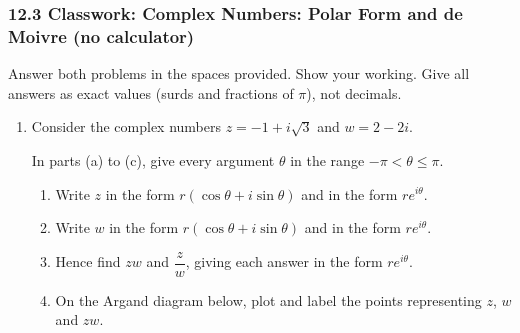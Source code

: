 \documentclass[12pt, twoside]{article}
\begin{document}
\subsubsection*{12.3 Classwork: Complex Numbers: Polar Form and de Moivre (no calculator)}

Answer both problems in the spaces provided. Show your working. Give
all answers as exact values (surds and fractions of $\pi$), not decimals.

\begin{enumerate}[itemsep=0.15cm]


\item[1.]

Consider the complex numbers $z = -1 + i\sqrt{3}$ and $w = 2 - 2i$.

In parts (a) to (c), give every argument $\theta$ in the range
$-\pi < \theta \leq \pi$.

\begin{enumerate}[itemsep=0.15cm]
  \item Write $z$ in the form $r(\cos\theta + i\sin\theta)$ and in the form
  $re^{i\theta}$.
  \item Write $w$ in the form $r(\cos\theta + i\sin\theta)$ and in the form
  $re^{i\theta}$.
  \item Hence find $zw$ and $\dfrac{z}{w}$, giving each answer in the form
  $re^{i\theta}$.
  \item On the Argand diagram below, plot and label the points representing
  $z$, $w$ and $zw$.
\end{enumerate}

\begin{center}
\end{center}


\end{enumerate}
\end{document}
